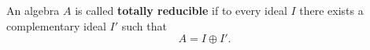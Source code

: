 An algebra $A$ is called \textbf{totally reducible} if to every ideal $I$ there exists a complementary ideal $I'$ such that
$$
A = I \oplus I'.
$$
